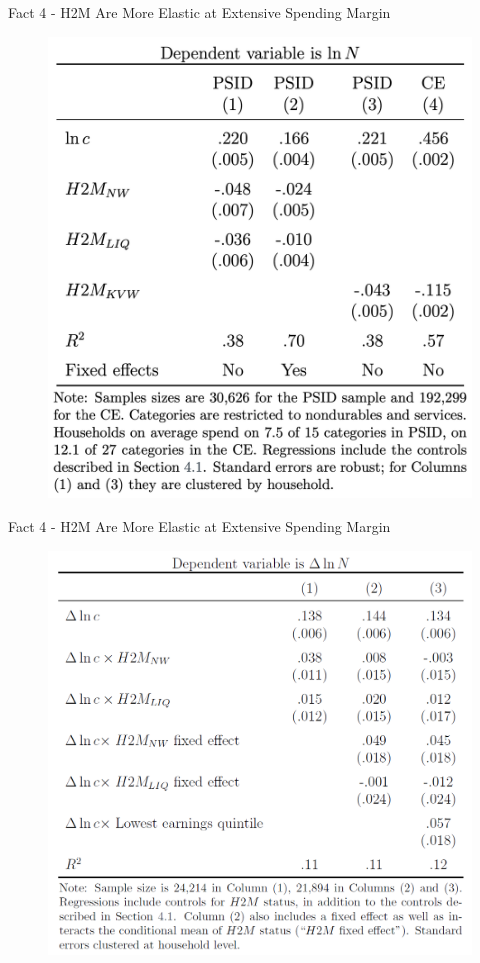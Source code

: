 \documentclass{beamer}
\begin{document}
\begin{frame}{Fact 4 - H2M Are More Elastic at Extensive Spending Margin}
	\label{fact4}
	\begin{figure}
		\centering
		\includegraphics[width=0.5\linewidth]{Figures/Table6.png}
	\end{figure}
\end{frame}
\begin{frame}{Fact 4 - H2M Are More Elastic at Extensive Spending Margin}
	\begin{figure}
		\centering
		\includegraphics[width=0.6\linewidth]{Figures/Table7.png}
	\end{figure}
\end{frame}
\end{document}
